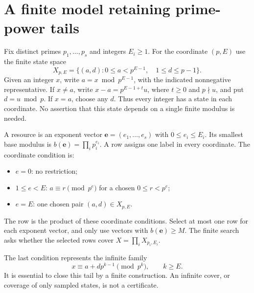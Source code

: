 \documentclass[11pt]{article}
\begin{document}
\section{A finite model retaining prime-power tails}
Fix distinct primes $p_1,\ldots,p_s$ and integers $E_i\geq1$.
For the coordinate $(p,E)$ use the finite state space
\[
 X_{p,E}=\{(a,d):0\leq a<p^{E-1},\quad1\leq d\leq p-1\}.
\]
Given an integer $x$, write $a=x\bmod p^{E-1}$, with the indicated
nonnegative representative. If $x\ne a$, write
$x-a=p^{E-1+t}u$, where $t\geq0$ and $p\nmid u$, and put
$d=u\bmod p$. If $x=a$, choose any $d$.
Thus every integer has a state in each coordinate. No assertion that this
state depends on a single finite modulus is needed.

A resource is an exponent vector $\mathbf e=(e_1,\ldots,e_s)$ with
$0\leq e_i\leq E_i$. Its smallest base modulus is
$b(\mathbf e)=\prod_i p_i^{e_i}$. A row assigns one label in every
coordinate. The coordinate condition is:
\begin{itemize}
\item $e=0$: no restriction;
\item $1\leq e<E$: $a\equiv r\pmod {p^e}$ for a chosen $0\leq r<p^e$;
\item $e=E$: one chosen pair $(a,d)\in X_{p,E}$.
\end{itemize}
The row is the product of these coordinate conditions. Select at most one
row for each exponent vector, and only use vectors with $b(\mathbf e)\geq M$.
The finite search asks whether the selected rows cover
$X=\prod_i X_{p_i,E_i}$.

The last condition represents the infinite family
\[
 x\equiv a+d p^{k-1}\pmod {p^k},\qquad k\geq E.
\]
It is essential to close this tail by a finite construction. An infinite
cover, or coverage of only sampled states, is not a certificate.
\end{document}
